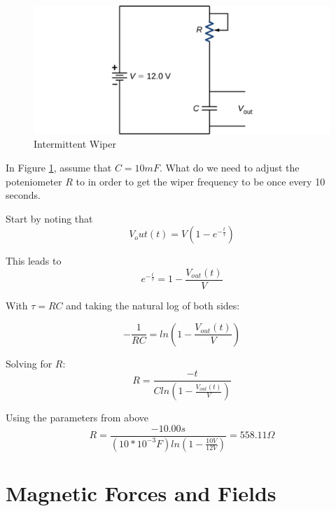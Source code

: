 \documentclass[14pt]{memoir}
\begin{document}
\begin{figure}[H]
\begin{center}
\includegraphics[scale=0.50]{fig/fig_10_iw.jpg}
\caption{Intermittent Wiper}
\label{fig:11_iw}
\end{center}
\end{figure}

In Figure \ref{fig:11_iw}, assume that $C = 10mF$. What do we need to adjust the poteniometer $R$ to in order to get the wiper frequency to be once every 10 seconds. 

Start by noting that 
\begin{equation}
V_out(t) = V(1 - e^{-\frac{t}{\tau}})
\end{equation}

This leads to 
\begin{equation}
e^{-\frac{t}{\tau}} = 1 -\frac{V_{out}(t)}{V}
\end{equation}

With $\tau = RC$ and taking the natural log of both sides:

\begin{equation}
-\frac{1}{RC} = ln(1 - \frac{V_{out}(t)}{V})
\end{equation}

Solving for $R$:
\begin{equation}
R = \frac{-t}{C ln(1 - \frac{V_{out}(t)}{V})}
\end{equation}

Using the parameters from above
\begin{equation}
R = \frac{- 10.00 s}{(10*10^{-3}F) ln(1 - \frac{10 V}{12 V})} = 558.11 \Omega
\end{equation}



\chapter{Magnetic Forces and Fields}
\end{document}
